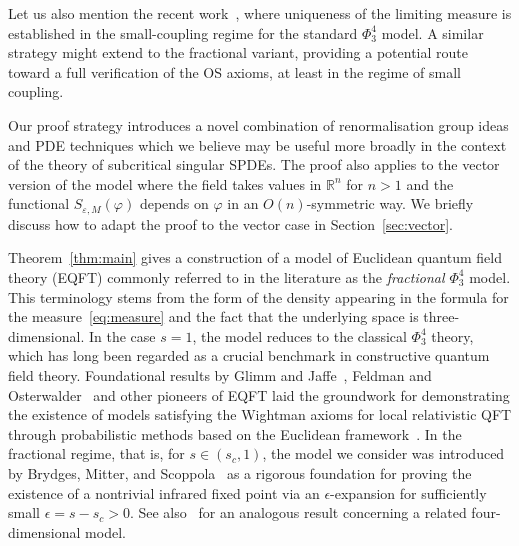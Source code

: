 \documentclass{article}
\numberwithin{equation}{section}
\theoremstyle{plain}
\theoremstyle{definition}
\begin{document}
Let us also mention the recent work~{\cite{duchErgodicityInfiniteVolume2025}},
where uniqueness of the limiting measure is established in the small-coupling
regime for the standard $\Phi^4_3$ model. A similar strategy might extend to
the fractional variant, providing a potential route toward a full verification
of the OS axioms, at least in the regime of small coupling.

Our proof strategy introduces a novel combination of renormalisation group
ideas and PDE techniques which we believe may be useful more broadly in the
context of the theory of subcritical singular SPDEs. The proof also applies to
the vector version of the model where the field takes values in $\mathbb{R}^n$
for $n > 1$ and the functional $S_{\varepsilon, M} (\varphi)$ depends on
$\varphi$ in an $O (n)$-symmetric way. We briefly discuss how
to adapt the proof to the vector case in Section~\ref{sec:vector}.

Theorem~\ref{thm:main} gives a construction of a model of Euclidean quantum
field theory (EQFT) commonly referred to in the literature as the
\textit{fractional $\Phi^4_3$} model. This terminology stems from the form
of the density appearing in the formula for the measure~\eqref{eq:measure} and
the fact that the underlying space is three-dimensional. In the case $s = 1$,
the model reduces to the classical $\Phi_3^4$ theory, which has long been
regarded as a crucial benchmark in constructive quantum field theory.
Foundational results by Glimm and
Jaffe~{\cite{glimmPositivityPhiHamiltonian1973}}, Feldman and
Osterwalder~{\cite{feldmanLambdaVarphiField1974,feldmanWightmanAxiomsMass1976}}
and other pioneers of EQFT laid the groundwork for demonstrating the existence
of models satisfying the Wightman axioms for local relativistic QFT through
probabilistic methods based on the Euclidean framework~{\cite{glimmQuantumPhysicsFunctional1987}}. In the
fractional regime, that is, for $s \in (s_c, 1)$, the model we consider was
introduced by Brydges, Mitter, and Scoppola~{\cite{brydgesCriticalF42003}} as
a rigorous foundation for proving the existence of a nontrivial infrared
fixed point via an $\epsilon$-expansion for sufficiently small $\epsilon = s -
s_c > 0$. See also~{\cite{brydges_non_gaussian_1998}} for an analogous result
concerning a related four-dimensional model.
\end{document}
